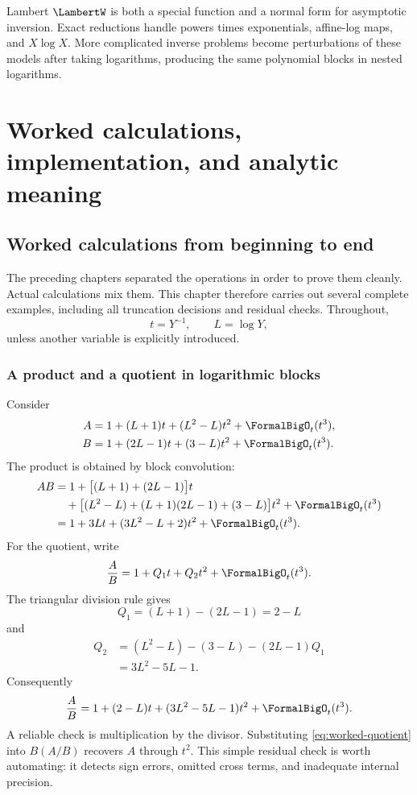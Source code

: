 \documentclass[11pt,oneside]{book}
\theoremstyle{definition}
\theoremstyle{remark}
\begin{document}
\begin{summarybox}
Lambert $\LambertW$ is both a special function and a normal form for asymptotic
inversion.  Exact reductions handle powers times exponentials, affine-log
maps, and $X\log X$.  More complicated inverse problems become perturbations
of these models after taking logarithms, producing the same polynomial blocks
in nested logarithms.
\end{summarybox}


\part{Worked calculations, implementation, and analytic meaning}
\label{part:practice}

\chapter{Worked calculations from beginning to end}
\label{ch:worked-calculations}

The preceding chapters separated the operations in order to prove them
cleanly. Actual calculations mix them. This chapter therefore carries out
several complete examples, including all truncation decisions and residual
checks. Throughout,
\[
 t=Y^{-1},\qquad L=\log Y,
\]
unless another variable is explicitly introduced.

\section{A product and a quotient in logarithmic blocks}
Consider
\begin{align*}
 A&=1+(L+1)t+(L^2-L)t^2+\FormalBigO_t(t^3),\\
 B&=1+(2L-1)t+(3-L)t^2+\FormalBigO_t(t^3).
\end{align*}
The product is obtained by block convolution:
\begin{align*}
 AB
 &=1+\bigl[(L+1)+(2L-1)\bigr]t\\
 &\quad+\bigl[(L^2-L)+(L+1)(2L-1)+(3-L)\bigr]t^2
   +\FormalBigO_t(t^3)\\
 &=1+3Lt+(3L^2-L+2)t^2+\FormalBigO_t(t^3).
\end{align*}
For the quotient, write
\[
 \frac AB=1+Q_1t+Q_2t^2+\FormalBigO_t(t^3).
\]
The triangular division rule gives
\[
 Q_1=(L+1)-(2L-1)=2-L
\]
and
\begin{align*}
 Q_2
 &=(L^2-L)-(3-L)-(2L-1)Q_1\\
 &=3L^2-5L-1.
\end{align*}
Consequently
\begin{equation}\label{eq:worked-quotient}
 \frac AB
 =1+(2-L)t+(3L^2-5L-1)t^2+\FormalBigO_t(t^3).
\end{equation}
A reliable check is multiplication by the divisor. Substituting
\eqref{eq:worked-quotient} into $B(A/B)$ recovers $A$ through $t^2$. This
simple residual check is worth automating: it detects sign errors, omitted
cross terms, and inadequate internal precision.
\end{document}
